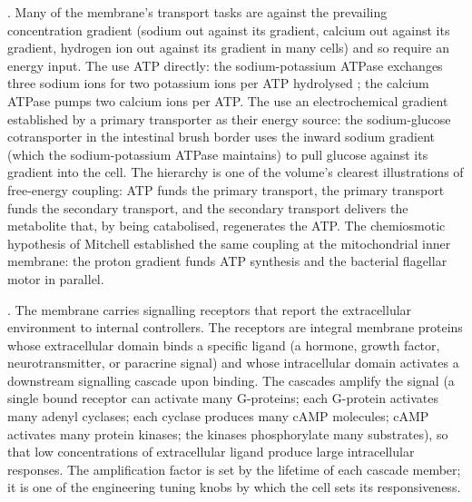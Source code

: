 . Many of the membrane's transport tasks are
against the prevailing concentration gradient (sodium out against its
gradient, calcium out against its gradient, hydrogen ion out against
its gradient in many cells) and so require an energy input. The
 use ATP directly: the
sodium-potassium ATPase exchanges three sodium ions for two potassium
ions per ATP hydrolysed \cite{paper:v6c01-skou-1957}; the calcium
ATPase pumps two calcium ions per ATP. The  use an electrochemical gradient established by a
primary transporter as their energy source: the sodium-glucose
cotransporter in the intestinal brush border uses the inward sodium
gradient (which the sodium-potassium ATPase maintains) to pull
glucose against its gradient into the cell. The hierarchy is one of
the volume's clearest illustrations of free-energy coupling: ATP
funds the primary transport, the primary transport funds the
secondary transport, and the secondary transport delivers the
metabolite that, by being catabolised, regenerates the ATP. The
chemiosmotic hypothesis of Mitchell \cite{paper:v6c01-mitchell-1961}
established the same coupling at the mitochondrial inner membrane:
the proton gradient funds ATP synthesis and the bacterial flagellar
motor in parallel.

. The membrane carries
signalling receptors that report the extracellular environment to
internal controllers. The receptors are integral membrane proteins
whose extracellular domain binds a specific ligand (a hormone, growth
factor, neurotransmitter, or paracrine signal) and whose intracellular
domain activates a downstream signalling cascade upon binding. The
cascades amplify the signal (a single bound receptor can activate
many G-proteins; each G-protein activates many adenyl cyclases; each
cyclase produces many cAMP molecules; cAMP activates many protein
kinases; the kinases phosphorylate many substrates), so that low
concentrations of extracellular ligand produce large intracellular
responses. The amplification factor is set by the lifetime of each
cascade member; it is one of the engineering tuning knobs by which
the cell sets its responsiveness.

